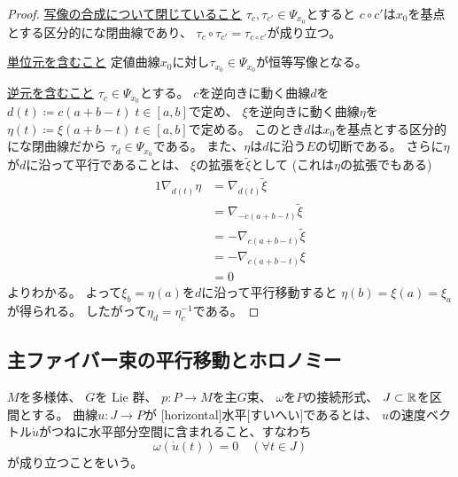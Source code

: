 \documentclass[report]{jlreq}
\begin{document}
\begin{proof}
    \uline{写像の合成について閉じていること} \quad
    $\tau_c, \tau_{c'} \in \Psi_{x_0}$とすると
    $c \circ c'$は$x_0$を基点とする区分的に{\smooth}な閉曲線であり、
    $\tau_c \circ \tau_{c'} = \tau_{c \circ c'}$が成り立つ。

    \uline{単位元を含むこと} \quad
    定値曲線$x_0$に対し$\tau_{x_0} \in \Psi_{x_0}$が恒等写像となる。

    \uline{逆元を含むこと} \quad
    $\tau_c \in \Psi_{x_0}$とする。
    $c$を逆向きに動く曲線$d$を
    $d(t) \coloneqq c(a + b - t) \; t \in [a, b]$で定め、
    $\xi$を逆向きに動く曲線$\eta$を
    $\eta(t) \coloneqq \xi(a + b - t) \; t \in [a, b]$で定める。
    このとき$d$は$x_0$を基点とする区分的に{\smooth}な閉曲線だから
    $\tau_d \in \Psi_{x_0}$である。
    また、$\eta$は$d$に沿う$E$の切断である。
    さらに$\eta$が$d$に沿って平行であることは、
    $\xi$の拡張を$\widetilde{\xi}$として
    (これは$\eta$の拡張でもある)
    \begin{alignat}{1}
        \nabla_{\dot{d}(t)} \eta
            &= \nabla_{\dot{d}(t)} \widetilde{\xi} \\
            &= \nabla_{- \dot{c}(a + b - t)} \widetilde{\xi} \\
            &= - \nabla_{\dot{c}(a + b - t)} \widetilde{\xi} \\
            &= - \nabla_{\dot{c}(a + b - t)} \xi \\
            &= 0
    \end{alignat}
    よりわかる。
    よって$\xi_b = \eta(a)$を$d$に沿って平行移動すると
    $\eta(b) = \xi(a) = \xi_a$が得られる。
    したがって$\eta_d = \eta_c^{-1}$である。
\end{proof}

%

\subsection{主ファイバー束の平行移動とホロノミー}

\begin{definition}[水平な曲線]
    $M$を多様体、
    $G$を Lie 群、
    $p \colon P \to M$を主$G$束、
    $\omega$を$P$の接続形式、
    $J \subset \mathbb{R}$を区間とする。
    {\smooth}曲線$u \colon J \to P$が
    [horizontal]{水平}[すいへい]であるとは、
    $u$の速度ベクトル$\dot{u}$がつねに水平部分空間に含まれること、すなわち
    \begin{equation}
        \omega(\dot{u}(t)) = 0
            \quad (\forall t \in J)
    \end{equation}
    が成り立つことをいう。
\end{definition}
\end{document}
